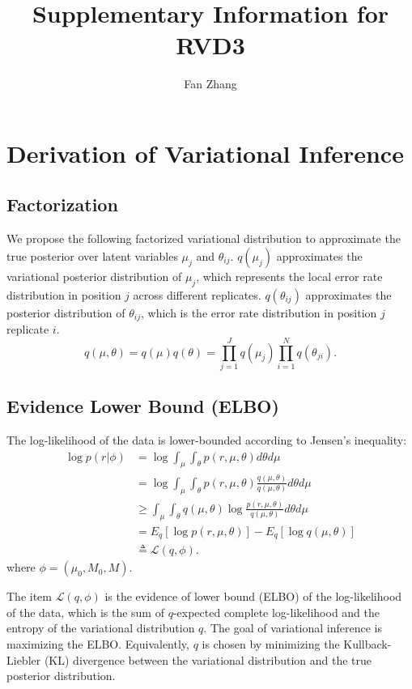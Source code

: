 \documentclass[11pt,reqno]{amsart}
\title[RVD3]{Supplementary Information for RVD3}
\author{Fan Zhang}
\date{}
\begin{document}
\maketitle
\section{Derivation of Variational Inference}
\subsection{Factorization}
We propose the following factorized variational distribution to approximate the true posterior over latent variables $\mu_j$ and $\theta_{ij}$. $q(\mu_j)$ approximates the variational posterior distribution of $\mu_j$, which represents the local error rate distribution in position $j$ across different replicates. $q(\theta_{ij})$ approximates the posterior distribution of $\theta_{ij}$, which is the error rate distribution in position $j$ replicate $i$.
\begin{equation}
  q(\mu, \theta) = q(\mu)q(\theta) = \prod_{j=1}^J q(\mu_{j}) \prod_{i=1}^N q(\theta_{ji}).
  \label{eq:vardist}
\end{equation}

\subsection{Evidence Lower Bound (ELBO)}
The log-likelihood of the data is lower-bounded according to Jensen's inequality:
\begin{equation}
\begin{split}
\log p \left( r | \phi \right) &= \log \int_\mu \int_\theta p\left(r,\mu,\theta \right) d\theta d\mu \\
&= \log \int_\mu \int_\theta p\left(r,\mu,\theta \right)\frac{q\left(\mu,\theta \right) }{q\left(\mu,\theta \right) } d\theta d\mu \\
&\geq \int_\mu \int_\theta q\left(\mu,\theta \right) \log \frac{ p\left(r,\mu,\theta \right)}{q\left(\mu,\theta \right)} d\theta d\mu \\
&= E_q \left[ \log p\left(r,\mu,\theta \right)\right] - E_q \left[ \log q\left(\mu,\theta \right)\right] \\
&\triangleq \mathcal{L}(q, \phi).
\end{split}
\end{equation}
where $ \phi= \left( \mu_0, M_0, M \right) $.

The item $\mathcal{L}(q, \phi)$ is the evidence of lower bound (ELBO) of the log-likelihood of the data, which is the sum of $q$-expected complete log-likelihood and the entropy of the variational distribution $q$. The goal of variational inference is maximizing the ELBO. Equivalently, $q$ is chosen by minimizing the Kullback-Liebler (KL) divergence between the variational distribution and the true posterior distribution.
\end{document}
